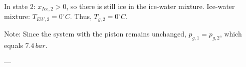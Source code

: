 In state 2: \( x_{Ice,2} > 0 \), so there is still ice in the ice-water mixture.  
Ice-water mixture: \( T_{EW,2} = 0^\circ C \).  
Thus, \( T_{g,2} = 0^\circ C \).  

Note: Since the system with the piston remains unchanged,  
\( p_{g,1} = p_{g,2} \), which equals \( 7.4 \, bar \).  

---
